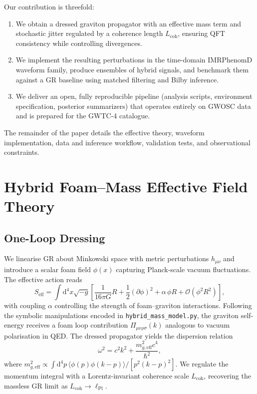 \documentclass[prd,onecolumn,longbibliography,nofootinbib]{revtex4-2}
\begin{document}
Our contribution is threefold:
\begin{enumerate}
    \item We obtain a dressed graviton propagator with an effective mass term and stochastic jitter regulated by a coherence length $L_{\mathrm{coh}}$, ensuring QFT consistency while controlling divergences.
    \item We implement the resulting perturbations in the time-domain IMRPhenomD waveform family, produce ensembles of hybrid signals, and benchmark them against a GR baseline using matched filtering and Bilby inference.
    \item We deliver an open, fully reproducible pipeline (analysis scripts, environment specification, posterior summarizers) that operates entirely on GWOSC data and is prepared for the GWTC-4 catalogue.
\end{enumerate}
The remainder of the paper details the effective theory, waveform implementation, data and inference workflow, validation tests, and observational constraints.

\section{Hybrid Foam--Mass Effective Field Theory}
\subsection{One-Loop Dressing}
We linearise GR about Minkowski space with metric perturbations $h_{\mu\nu}$ and introduce a scalar foam field $\phi(x)$ capturing Planck-scale vacuum fluctuations. The effective action reads
\begin{equation}
    S_{\mathrm{eff}} = \int \mathrm{d}^4 x \sqrt{-g} \left[ \frac{1}{16\pi G} R + \frac{1}{2} (\partial \phi)^2 + \alpha \, \phi R + \mathcal{O}(\phi^2 R^2) \right],
\end{equation}
with coupling $\alpha$ controlling the strength of foam--graviton interactions. Following the symbolic manipulations encoded in \texttt{hybrid\_mass\_model.py}, the graviton self-energy receives a foam loop contribution $\Pi_{\mu\nu\rho\sigma}(k)$ analogous to vacuum polarisation in QED. The dressed propagator yields the dispersion relation
\begin{equation}
    \omega^2 = c^2 k^2 + \frac{m_{g,\mathrm{eff}}^2 c^4}{\hbar^2},
\end{equation}
where $m_{g,\mathrm{eff}}^2 \propto \int \mathrm{d}^4 p \, \langle \phi(p) \phi(k-p) \rangle / [p^2 (k-p)^2]$. We regulate the momentum integral with a Lorentz-invariant coherence scale $L_{\mathrm{coh}}$, recovering the massless GR limit as $L_{\mathrm{coh}} \rightarrow \ell_{\mathrm{Pl}}$.
\end{document}
